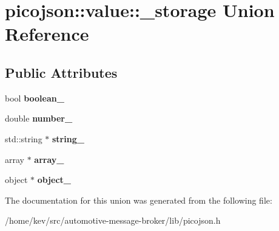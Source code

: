 \hypertarget{unionpicojson_1_1value_1_1__storage}{\section{picojson\+:\+:value\+:\+:\+\_\+storage Union Reference}
\label{unionpicojson_1_1value_1_1__storage}
}
\subsection*{Public Attributes}
\begin{DoxyCompactItemize}
\item 
\hypertarget{unionpicojson_1_1value_1_1__storage_a612a1a8ceb65bdd2e8f09eb33074ba0b}{bool {\bfseries boolean\+\_\+}}\label{unionpicojson_1_1value_1_1__storage_a612a1a8ceb65bdd2e8f09eb33074ba0b}

\item 
\hypertarget{unionpicojson_1_1value_1_1__storage_a4fc799f222c28156f943a891e510e438}{double {\bfseries number\+\_\+}}\label{unionpicojson_1_1value_1_1__storage_a4fc799f222c28156f943a891e510e438}

\item 
\hypertarget{unionpicojson_1_1value_1_1__storage_a9ec5aa5b86bbef81b15697c936f58736}{std\+::string $\ast$ {\bfseries string\+\_\+}}\label{unionpicojson_1_1value_1_1__storage_a9ec5aa5b86bbef81b15697c936f58736}

\item 
\hypertarget{unionpicojson_1_1value_1_1__storage_aeac6ef9328845f1f6402c35bb281990a}{array $\ast$ {\bfseries array\+\_\+}}\label{unionpicojson_1_1value_1_1__storage_aeac6ef9328845f1f6402c35bb281990a}

\item 
\hypertarget{unionpicojson_1_1value_1_1__storage_ad1feb283e78999609c7a27be95e5f4df}{object $\ast$ {\bfseries object\+\_\+}}\label{unionpicojson_1_1value_1_1__storage_ad1feb283e78999609c7a27be95e5f4df}

\end{DoxyCompactItemize}


The documentation for this union was generated from the following file\+:\begin{DoxyCompactItemize}
\item 
/home/kev/src/automotive-\/message-\/broker/lib/picojson.\+h\end{DoxyCompactItemize}
